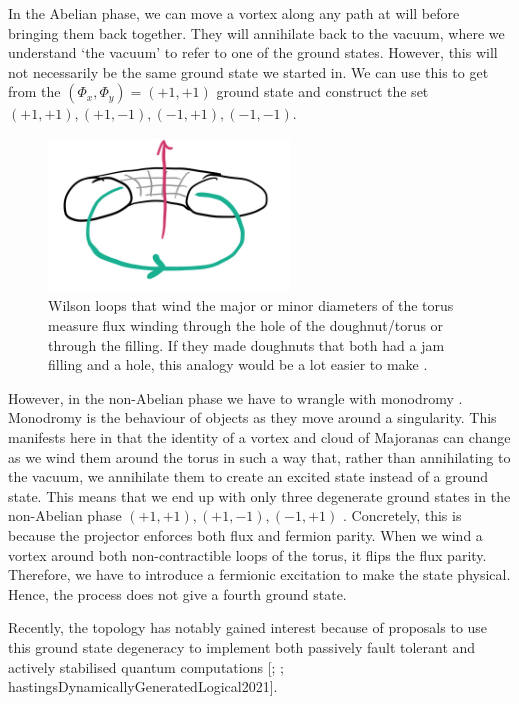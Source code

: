 In the Abelian phase, we can move a vortex along any path at will before bringing them back together. They will annihilate back to the vacuum, where we understand `the vacuum' to refer to one of the ground states. However, this will not necessarily be the same ground state we started in. We can use this to get from the \((\Phi_x, \Phi_y) = (+1, +1)\) ground state and construct the set \((+1, +1), (+1, -1), (-1, +1), (-1, -1)\).

\begin{figure}
\hypertarget{fig:topological_fluxes}{%
\centering
\includegraphics[width=0.57\textwidth,height=\textheight]{figure_code/amk_chapter/topological_fluxes.png}
\caption{Wilson loops that wind the major or minor diameters of the torus measure flux winding through the hole of the doughnut/torus or through the filling. If they made doughnuts that both had a jam filling and a hole, this analogy would be a lot easier to make \textcite{parkerWhyDoesThis}.}\label{fig:topological_fluxes}
}
\end{figure}

However, in the non-Abelian phase we have to wrangle with monodromy \autocite{chungExplicitMonodromyMoore2007,oshikawaTopologicalDegeneracyNonAbelian2007}. Monodromy is the behaviour of objects as they move around a singularity. This manifests here in that the identity of a vortex and cloud of Majoranas can change as we wind them around the torus in such a way that, rather than annihilating to the vacuum, we annihilate them to create an excited state instead of a ground state. This means that we end up with only three degenerate ground states in the non-Abelian phase \((+1, +1), (+1, -1), (-1, +1)\) \autocite[yaoAlgebraicSpinLiquid2009a]{chungTopologicalQuantumPhase2010}. Concretely, this is because the projector enforces both flux and fermion parity. When we wind a vortex around both non-contractible loops of the torus, it flips the flux parity. Therefore, we have to introduce a fermionic excitation to make the state physical. Hence, the process does not give a fourth ground state.

Recently, the topology has notably gained interest because of proposals to use this ground state degeneracy to implement both passively fault tolerant and actively stabilised quantum computations {[}\textcite{kitaevFaulttolerantQuantumComputation2003}; \textcite{poulinStabilizerFormalismOperator2005}; hastingsDynamicallyGeneratedLogical2021{]}.
